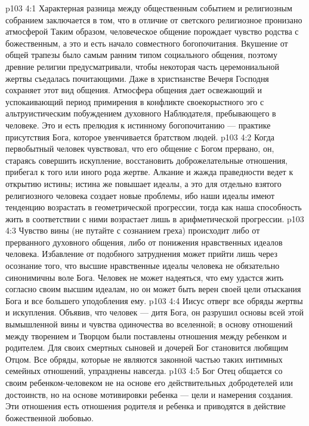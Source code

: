 \vs p103 4:1 Характерная разница между общественным событием и религиозным собранием заключается в том, что в отличие от светского религиозное пронизано атмосферой  Таким образом, человеческое общение порождает чувство родства с божественным, а это и есть начало совместного богопочитания. Вкушение от общей трапезы было самым ранним типом социального общения, поэтому древние религии предусматривали, чтобы некоторая часть церемониальной жертвы съедалась почитающими. Даже в христианстве Вечеря Господня сохраняет этот вид общения. Атмосфера общения дает освежающий и успокаивающий период примирения в конфликте своекорыстного эго с альтруистическим побуждением духовного Наблюдателя, пребывающего в человеке. Это и есть прелюдия к истинному богопочитанию --- практике присутствия Бога, которое увенчивается братством людей.
\vs p103 4:2 Когда первобытный человек чувствовал, что его общение с Богом прервано, он, стараясь совершить искупление, восстановить доброжелательные отношения, прибегал к того или иного рода жертве. Алкание и жажда праведности ведет к открытию истины; истина же повышает идеалы, а это для отдельно взятого религиозного человека создает новые проблемы, ибо наши идеалы имеют тенденцию возрастать в геометрической прогрессии, тогда как наша способность жить в соответствии с ними возрастает лишь в арифметической прогрессии.
\vs p103 4:3 Чувство вины (не путайте с сознанием греха) происходит либо от прерванного духовного общения, либо от понижения нравственных идеалов человека. Избавление от подобного затруднения может прийти лишь через осознание того, что высшие нравственные идеалы человека не обязательно синонимичны воле Бога. Человек не может надеяться, что ему удастся жить согласно своим высшим идеалам, но он может быть верен своей цели отыскания Бога и все большего уподобления ему.
\vs p103 4:4 Иисус отверг все обряды жертвы и искупления. Объявив, что человек --- дитя Бога, он разрушил основы всей этой вымышленной вины и чувства одиночества во вселенной; в основу отношений между творением и Творцом были поставлены отношения между ребенком и родителем. Для своих смертных сыновей и дочерей Бог становится любящим Отцом. Все обряды, которые не являются законной частью таких интимных семейных отношений, упразднены навсегда.
\vs p103 4:5 Бог Отец общается со своим ребенком\hyp{}человеком не на основе его действительных добродетелей или достоинств, но на основе мотивировки ребенка --- цели и намерения создания. Эти отношения есть отношения родителя и ребенка и приводятся в действие божественной любовью.
